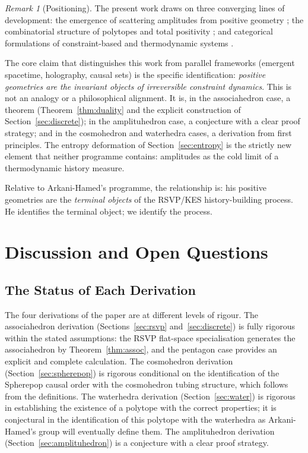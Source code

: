 \documentclass[12pt, oneside]{amsart}
\theoremstyle{plain}
\theoremstyle{definition}
\theoremstyle{remark}
\newtheorem{remark}[theorem]{Remark}
\begin{document}
\begin{remark}[Positioning]
The present work draws on three converging lines of development: the emergence of scattering amplitudes from positive geometry \cite{ArkaniHamed2017, ArkaniHamed2014, ArkaniHamed2012}; the combinatorial structure of polytopes and total positivity \cite{Stasheff1963, Loday2004, Ziegler1995, Postnikov2006}; and categorical formulations of constraint-based and thermodynamic systems \cite{MacLane1998, Leinster2014, Jaynes1957, Landauer1961}.

The core claim that distinguishes this work from parallel frameworks (emergent spacetime, holography, causal sets) is the specific identification: \emph{positive geometries are the invariant objects of irreversible constraint dynamics}. This is not an analogy or a philosophical alignment. It is, in the associahedron case, a theorem (Theorem~\ref{thm:duality} and the explicit construction of Section~\ref{sec:discrete}); in the amplituhedron case, a conjecture with a clear proof strategy; and in the cosmohedron and waterhedra cases, a derivation from first principles. The entropy deformation of Section~\ref{sec:entropy} is the strictly new element that neither programme contains: amplitudes as the cold limit of a thermodynamic history measure.

Relative to Arkani-Hamed's programme, the relationship is: his positive geometries are the \emph{terminal objects} of the RSVP/KES history-building process. He identifies the terminal object; we identify the process.
\end{remark}

\section{Discussion and Open Questions}
\label{sec:discussion}

\subsection{The Status of Each Derivation}

The four derivations of the paper are at different levels of rigour. The associahedron derivation (Sections~\ref{sec:rsvp} and~\ref{sec:discrete}) is fully rigorous within the stated assumptions: the RSVP flat-space specialisation generates the associahedron by Theorem~\ref{thm:assoc}, and the pentagon case provides an explicit and complete calculation. The cosmohedron derivation (Section~\ref{sec:spherepop}) is rigorous conditional on the identification of the Spherepop causal order with the cosmohedron tubing structure, which follows from the definitions. The waterhedra derivation (Section~\ref{sec:water}) is rigorous in establishing the existence of a polytope with the correct properties; it is conjectural in the identification of this polytope with the waterhedra as Arkani-Hamed's group will eventually define them. The amplituhedron derivation (Section~\ref{sec:amplituhedron}) is a conjecture with a clear proof strategy.
\end{document}
